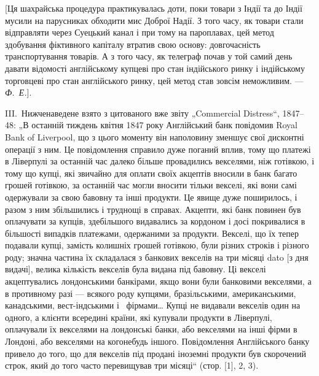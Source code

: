 
[Ця шахрайська процедура практикувалась доти, поки товари з Індії та до
Індії мусили на парусниках обходити мис Доброї Надії. З того часу, як товари
стали відправляти через Суецький канал і при тому на пароплавах, цей метод
здобування фіктивного капіталу втратив свою основу: довгочасність транспортування товарів. А з того
часу, як телеграф почав у той самий день давати відомості англійському купцеві про стан індійського
ринку і індійському торговцеві про стан англійського ринку, цей метод став зовсім неможливим. — \emph{Ф.~Е.}].

III.~Нижченаведене взято з цитованого вже звіту „Commercial Distress“,
1847--48: „В останній тиждень квітня 1847 року Англійський банк повідомив
Royal Bank of Liverpool, що з цього моменту він наполовину зменшує свої дисконтні операції з ним. Це
повідомлення справило дуже поганий вплив, тому
що платежі в Ліверпулі за останній час далеко більше провадились векселями,
ніж готівкою, і тому що купці, які звичайно для оплати своїх акцептів вносили
в банк багато грошей готівкою, за останній час могли вносити тільки векселі,
які вони самі одержували за свою бавовну та інші продукти. Це явище дуже
поширилось, і разом з ним збільшились і труднощі в справах. Акцепти, які
банк повинен був оплачувати за купців, здебільшого видавались за кордоном
і досі покривалися в більшості випадків платежами, одержаними за продукти. Векселі, що їх тепер
подавали купці, замість колишніх грошей готівкою, були
різних строків і різного роду; значна частина їх складалася з банкових векселів на три місяці dato
[з дня видачі], велика кількість векселів була видана
під бавовну. Ці векселі акцептувались лондонськими банкірами, якщо вони були
банковими векселями, а в противному разі — всякого роду купцями, бразільськими,
американськими, канадськими, вест-індськими і~ фірмами\dots{} Купці не видавали векселів один на
одного, а клієнти всередині країни, які купували продукти в Ліверпулі, оплачували їх векселями на
лондонські банки, або векселями на інші фірми в Лондоні, або векселями на когонебудь іншого.
Повідомлення Англійського банку привело до того, що для векселів під продані іноземні продукти був
скорочений строк, який до того часто перевищував три місяці“ (стор. [1], 2, 3).

